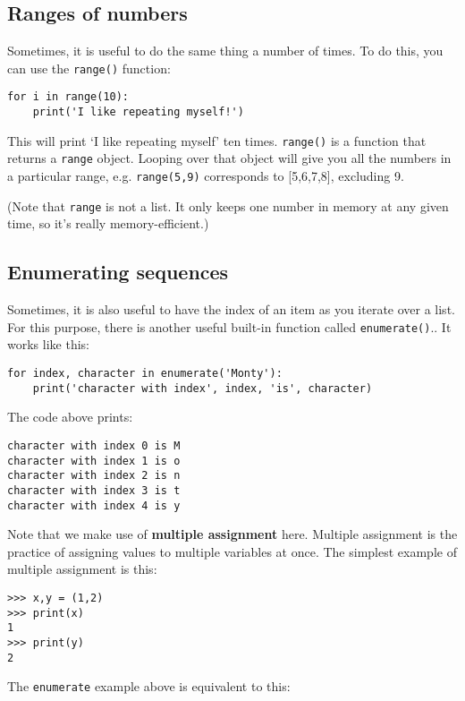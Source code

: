 \documentclass[12pt]{book}
\begin{document}
\subsection{Ranges of numbers}
Sometimes, it is useful to do the same thing a number of times. To do this, you can use the \texttt{range()} function:

\begin{lstlisting}
for i in range(10):
    print('I like repeating myself!')
\end{lstlisting}

This will print `I like repeating myself' ten times. \texttt{range()} is a function that returns a \texttt{range} object. Looping over that object will give you all the numbers in a particular range, e.g. \texttt{range(5,9)} corresponds to {[}5,6,7,8{]}, excluding 9.

(Note that \texttt{range} is not a list. It only keeps one number in
memory at any given time, so it's really memory-efficient.)

\subsection{Enumerating sequences}
Sometimes, it is also useful to have the index of an item as you iterate over a list. For this purpose, there is another useful built-in function called \texttt{enumerate()}.. It works like this:

\begin{lstlisting}
for index, character in enumerate('Monty'):
    print('character with index', index, 'is', character)
\end{lstlisting}

The code above prints:

\begin{verbatim}
character with index 0 is M
character with index 1 is o
character with index 2 is n
character with index 3 is t
character with index 4 is y
\end{verbatim}

Note that we make use of \textbf{multiple assignment} here. Multiple assignment is the practice of assigning values to multiple variables at once. The simplest example of multiple assignment is this:

\begin{lstlisting}
>>> x,y = (1,2)
>>> print(x)
1
>>> print(y)
2
\end{lstlisting}

The \texttt{enumerate} example above is equivalent to this:
\end{document}
